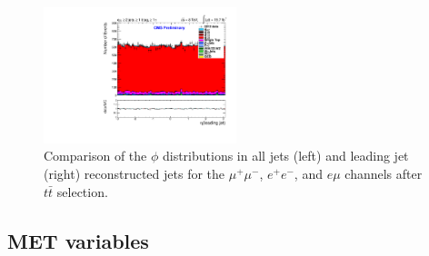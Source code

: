 \documentclass[oneside, a4paper, 11pt, ]{report}
\begin{document}
\begin{figure}
\includegraphics[width=0.5\textwidth]{Plots/ControlPlots/TTbarDiLeptonAnalysis/EMu/Jets/jet1_phi_splitTTbar_ratio.pdf}
\caption{Comparison of the $\phi$ distributions in all jets (left) and leading jet (right) reconstructed jets for the $\mu^{+}\mu^{-}$, $e^{+}e^{-}$, and $e\mu$ channels after $t\bar{t}$ selection.}
\label{fig-jets}
\end{figure}

\subsection{MET variables} \label{subsec-METPlots}
\end{document}
